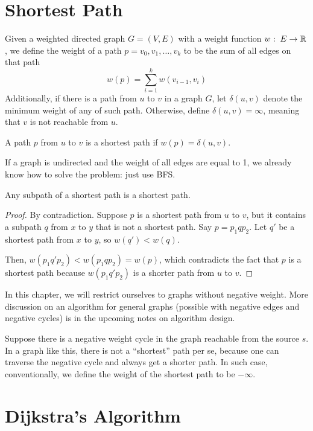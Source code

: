 \section{Shortest Path}

Given a weighted directed graph $G=(V,E)$ with a weight function $w:\; E \to \mathbb{R}$, we define the weight of a path $p = v_0,v_1,\ldots,v_k$ to be the sum of all edges on that path
$$
w(p) = \sum_{i=1}^k w(v_{i-1},v_i)
$$
Additionally, if there is a path from $u$ to $v$ in a graph $G$, let $\delta(u,v)$ denote the minimum weight of any of such path. Otherwise, define $\delta(u,v) = \infty$, meaning that $v$ is not reachable from $u$. 

A path $p$ from $u$ to $v$ is a shortest path if $w(p) = \delta(u,v)$.

If a graph is undirected and the weight of all edges are equal to 1, we already know how to solve the problem: just use BFS.

\begin{lemma}
    Any subpath of a shortest path is a shortest path.
\end{lemma}

\begin{proof}
    By contradiction. Suppose $p$ is a shortest path from $u$ to $v$, but it contains a subpath $q$ from $x$ to $y$ that is not a shortest path. Say $p = p_1 q p_2$. Let $q'$ be a shortest path from $x$ to $y$, so $w(q') < w(q)$.

    Then, $w(p_1q'p_2) < w(p_1qp_2) = w(p)$, which contradicts the fact that $p$ is a shortest path because $w(p_1q'p_2)$ is a shorter path from $u$ to $v$. 
\end{proof}

In this chapter, we will restrict ourselves to graphs without negative weight. More discussion on an algorithm for general graphs (possible with negative edges and negative cycles) is in the upcoming notes on algorithm design.

Suppose there is a negative weight cycle in the graph reachable from the source $s$. In a graph like this, there is not a ``shortest'' path per se, because one can traverse the negative cycle and always get a shorter path. In such case, conventionally, we define the weight of the shortest path to be $-\infty$. 

\section{Dijkstra's Algorithm}

